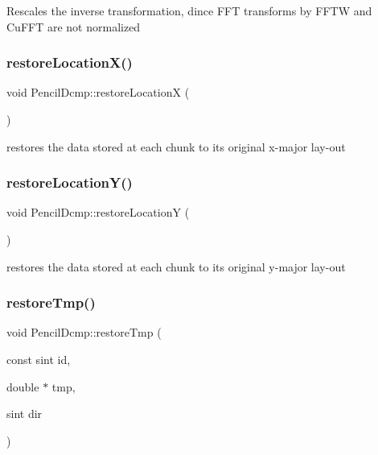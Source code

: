 Rescales the inverse transformation, dince F\+FT transforms by F\+F\+TW and Cu\+F\+FT are not normalized \mbox{\label{classPencilDcmp_a559e7d0018fe962d6a73e2f70f831de0}} 
\subsubsection{\texorpdfstring{restore\+Location\+X()}{restoreLocationX()}}
{\footnotesize\ttfamily void Pencil\+Dcmp\+::restore\+LocationX (\begin{DoxyParamCaption}{ }\end{DoxyParamCaption})}

restores the data stored at each chunk to its original x-\/major lay-\/out \mbox{\label{classPencilDcmp_a30c55e0b0ae5ecbe1eeb005190c89e21}} 
\subsubsection{\texorpdfstring{restore\+Location\+Y()}{restoreLocationY()}}
{\footnotesize\ttfamily void Pencil\+Dcmp\+::restore\+LocationY (\begin{DoxyParamCaption}{ }\end{DoxyParamCaption})}

restores the data stored at each chunk to its original y-\/major lay-\/out \mbox{\label{classPencilDcmp_ae46aa4d19c1c33f1c6ba9f0ae8d53247}} 
\subsubsection{\texorpdfstring{restore\+Tmp()}{restoreTmp()}}
{\footnotesize\ttfamily void Pencil\+Dcmp\+::restore\+Tmp (\begin{DoxyParamCaption}\item[{const sint}]{id,  }\item[{double $\ast$}]{tmp,  }\item[{sint}]{dir }\end{DoxyParamCaption})}

